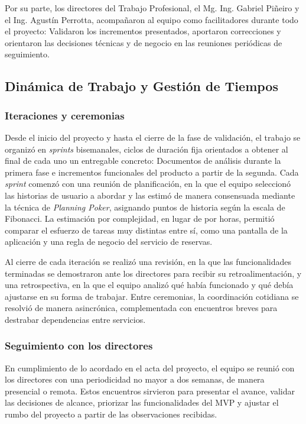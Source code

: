 Por su parte, los directores del Trabajo Profesional, el Mg. Ing. Gabriel Piñeiro y el Ing. Agustín Perrotta, acompañaron al equipo como facilitadores durante todo el proyecto: Validaron los incrementos presentados, aportaron correcciones y orientaron las decisiones técnicas y de negocio en las reuniones periódicas de seguimiento.

\subsection{Dinámica de Trabajo y Gestión de Tiempos}\label{sec:dinamica}

\subsubsection{Iteraciones y ceremonias}

Desde el inicio del proyecto y hasta el cierre de la fase de validación, el trabajo se organizó en \textit{sprints} bisemanales, ciclos de duración fija orientados a obtener al final de cada uno un entregable concreto: Documentos de análisis durante la primera fase e incrementos funcionales del producto a partir de la segunda. Cada \textit{sprint} comenzó con una reunión de planificación, en la que el equipo seleccionó las historias de usuario a abordar y las estimó de manera consensuada mediante la técnica de \textit{Planning Poker}, asignando puntos de historia según la escala de Fibonacci. La estimación por complejidad, en lugar de por horas, permitió comparar el esfuerzo de tareas muy distintas entre sí, como una pantalla de la aplicación y una regla de negocio del servicio de reservas.

Al cierre de cada iteración se realizó una revisión, en la que las funcionalidades terminadas se demostraron ante los directores para recibir su retroalimentación, y una retrospectiva, en la que el equipo analizó qué había funcionado y qué debía ajustarse en su forma de trabajar. Entre ceremonias, la coordinación cotidiana se resolvió de manera asincrónica, complementada con encuentros breves para destrabar dependencias entre servicios.

\subsubsection{Seguimiento con los directores}

En cumplimiento de lo acordado en el acta del proyecto, el equipo se reunió con los directores con una periodicidad no mayor a dos semanas, de manera presencial o remota. Estos encuentros sirvieron para presentar el avance, validar las decisiones de alcance, priorizar las funcionalidades del MVP y ajustar el rumbo del proyecto a partir de las observaciones recibidas.


